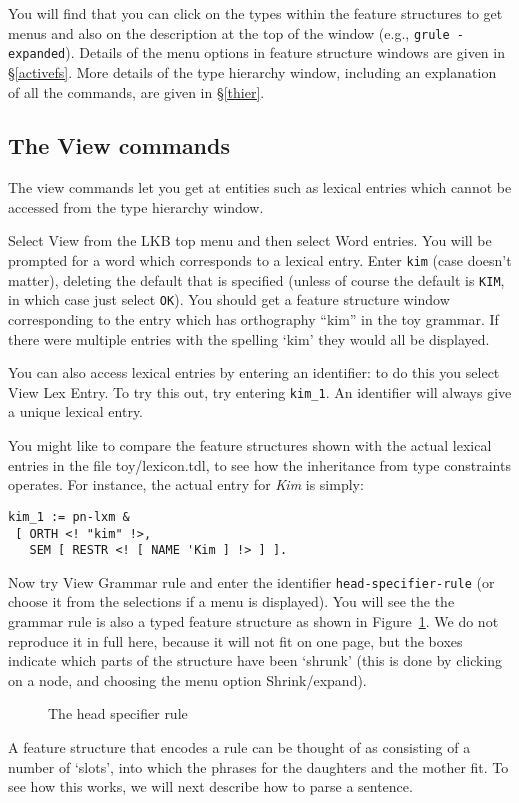 \documentclass[12pt]{report}
\newcommand{\lkbmenucommand}{{\bf}}
\begin{document}
You will find that
you can click on the types within the feature structures to get menus
and also on the description at the top of the window
(e.g., {\tt grule - expanded}).
Details of the menu options in feature structure windows 
are given in \S\ref{activefs}.
More details of the type hierarchy window, including an explanation of all the
commands,
are given in \S\ref{thier}.

\subsection{The View commands}

The view commands let you get at entities such as lexical entries which cannot
be accessed from the type hierarchy window.  

Select {\lkbmenucommand View} from the LKB top menu and then select 
{\lkbmenucommand Word entries}.
You will be prompted for a word which corresponds to a lexical entry.
Enter {\tt kim} (case doesn't matter), deleting the default that
is specified (unless of course the default is {\tt KIM}, in which
case just select {\tt OK}).
You should get a feature structure window corresponding to the entry 
which has orthography ``kim'' in the toy grammar.
If there were multiple entries with the spelling `kim' they would all
be displayed. 

You can also access lexical entries by entering an identifier: to
do this you select {\lkbmenucommand View} {\lkbmenucommand Lex Entry}.  
To try this out, try entering {\tt kim\_1}.
An identifier will always
give a unique lexical entry.  

You might like 
to compare the feature structures shown with the actual lexical
entries in the file toy/lexicon.tdl, to see how the inheritance from type
constraints operates.  For instance, the actual entry for {\it Kim} is
simply:
\begin{verbatim}
kim_1 := pn-lxm & 
 [ ORTH <! "kim" !>,
   SEM [ RESTR <! [ NAME 'Kim ] !> ] ].
\end{verbatim}

Now try {\lkbmenucommand View} {\lkbmenucommand Grammar rule} and 
enter the identifier
{\tt head-specifier-rule} (or choose
it from the selections if a 
menu is displayed).  You will see the the grammar rule
is also a typed feature structure as shown in Figure~\ref{rulefs}.
We do not reproduce it in full here, because
it will not fit on one page, but the boxes indicate which parts of the
structure have been `shrunk' (this is done by clicking on a node,
and choosing the menu option {\lkbmenucommand Shrink/expand}).
\begin{figure}
\epsfxsize=4in
\caption{The head specifier rule}
\label{rulefs}
\end{figure}
A feature structure that encodes a rule can be thought of
as consisting of a number of `slots', into which the phrases for
the daughters and the mother fit.  To see how this works,
we will next describe how to parse a sentence.
\end{document}
